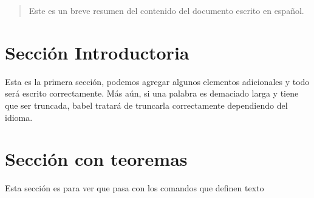 \documentclass{article}
\begin{document}
\tableofcontents

\vspace{2cm} %

\begin{abstract}
Este es un breve resumen del contenido del 
documento escrito en español.
\end{abstract}

\section{Sección Introductoria}
Esta es la primera sección, podemos agregar 
algunos elementos adicionales y todo será 
escrito correctamente. Más aún, si una palabra 
es demaciado larga y tiene que ser truncada, 
babel tratará de truncarla correctamente 
dependiendo del idioma.

\section{Sección con teoremas}
Esta sección es para ver que pasa con los comandos 
que definen texto
\end{document}
